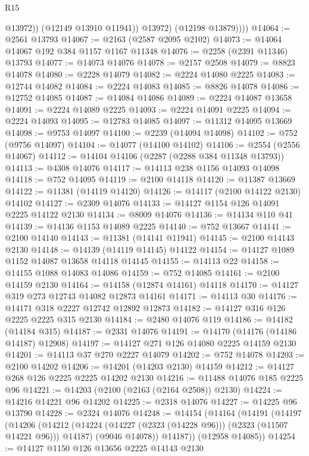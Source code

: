 \begin{lexlean}{R15}
\begin{coremodule}
                  @13972))
              (@12149 @13910 @11941))
            @13972)
          (@12198 @13879))))
@14064 := @2561 @13793
@14067 := @2163 (@2587 @2095 @2102)
@14073 := @14064 @14067 @192 @384 @1157 @1167 @11348
@14076 := @2258 (@2391 @11346) @13793
@14077 := @14073 @14076
@14078 := @2157 @2508
@14079 := @8823 @14078
@14080 := @2228 @14079
@14082 := @2224 @14080 @2225
@14083 := @12744 @14082
@14084 := @2224 @14083
@14085 := @8826 @14078
@14086 := @12752 @14085
@14087 := @14084 @14086
@14089 := @2224 @14087 @13658
@14091 := @2224 @14089 @2225
@14093 := @2224 @14091 @2225
@14094 := @2224 @14093
@14095 := @12783 @14085
@14097 := @11312 @14095 @13669
@14098 := @9753 @14097
@14100 := @2239 (@14094 @14098)
@14102 := @752 (@9756 @14097)
@14104 := @14077 (@14100 @14102)
@14106 := @2554 (@2556 @14067)
@14112 := @14104 @14106 (@2287 (@2288 @384 @11348 @13793))
@14113 := @4308 @14076
@14117 := @14113 @238 @1156 @14093 @14098
@14118 := @752 @14095
@14119 := @2100 @14118
@14120 := @11387 @13669
@14122 := @11381 (@14119 @14120)
@14126 := @14117 (@2100 @14122 @2130) @14102
@14127 := @2309 @14076
@14133 := @14127 @1154 @126 @14091 @2225 @14122 @2130
@14134 := @8009 @14076
@14136 := @14134 @110 @41
@14139 := @14136 @1153 @14089 @2225
@14140 := @752 @13667
@14141 := @2100 @14140
@14143 := @11381 (@14141 @11941)
@14145 := @2100 @14143 @2130
@14148 := @14139 (@14119 @14145) @14122
@14154 := @14127 @1089 @1152 @14087 @13658 @14118 @14145
@14155 := @14113 @22
@14158 := @14155 @1088 @14083 @14086
@14159 := @752 @14085
@14161 := @2100 @14159 @2130
@14164 := @14158 (@12874 @14161) @14118
@14170 := @14127 @319 @273 @12743 @14082 @12873 @14161
@14171 := @14113 @30
@14176 := @14171 @318 @2227 @12742 @12892 @12873
@14182 := @14127 @316 @126 @2225 @2225 @315 @2130
@14184 := @2480 @14076 @119
@14186 := @14182 (@14184 @315)
@14187 := @2331 @14076
@14191 := @14170 (@14176 (@14186 @14187) @12908)
@14197 := @14127 @271 @126 @14080 @2225 @14159 @2130
@14201 := @14113 @37 @270 @2227 @14079
@14202 := @752 @14078
@14203 := @2100 @14202
@14206 := @14201 (@14203 @2130) @14159
@14212 := @14127 @268 @126 @2225 @2225 @14202 @2130
@14216 := @11488 @14076 @185 @2225 @96
@14221 := @14203 (@2100 (@2163 (@2164 @2508)) @2130)
@14224 := @14216 @14221 @96 @14202
@14225 := @2318 @14076
@14227 := @14225 @96 @13790
@14228 := @2324 @14076
@14248 := @14154
    (@14164
      (@14191
        (@14197
          (@14206
            (@14212 (@14224 (@14227 (@2323 (@14228 @96))) (@2323 (@11507 @14221 @96))) @14187)
            (@9046 @14078))
          @14187))
      (@12958 @14085))
@14254 := @14127 @1150 @126 @13656 @2225 @14143 @2130

\end{coremodule}
\end{lexlean}
